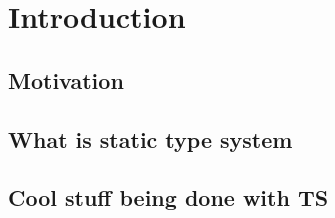 \chapter{Introduction}

\section{Motivation}

\section{What is static type system}

\section{Cool stuff being done with TS}

